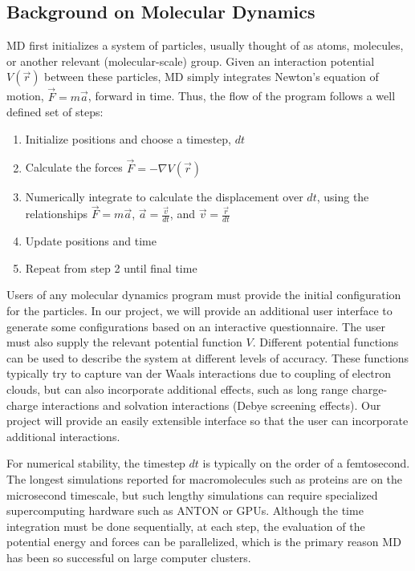 \documentclass[10pt]{article}
\begin{document}
\subsection{Background on Molecular Dynamics}
MD first initializes a system of particles, usually thought of as atoms, molecules, or another relevant (molecular-scale) group.  Given an interaction potential $V (\overrightarrow{r})$ between these particles, MD simply integrates Newton's equation of motion, $\overrightarrow{F}=m\overrightarrow{a}$, forward in time.  Thus, the flow of the program follows a well defined set of steps:
\begin{enumerate}
    \item Initialize positions and choose a timestep, $dt$
    \item Calculate the forces $\overrightarrow{F} =  -\nabla V (\overrightarrow{r}) $
    \item Numerically integrate to calculate the displacement over $dt$, using the relationships $\overrightarrow{F}=m\overrightarrow{a}$, $\overrightarrow{a} = \frac{\overrightarrow{v}}{dt}$, and $\overrightarrow{v} = \frac{\overrightarrow{r}}{dt}$
    \item Update positions and time
    \item Repeat from step 2 until final time
\end{enumerate}

Users of any molecular dynamics program must provide the initial configuration for the particles.  In our project, we will provide an additional user interface to generate some configurations based on an interactive questionnaire. The user must also supply the relevant potential function $V$. Different potential functions can be used to describe the system at different levels of accuracy. These functions typically try to capture van der Waals interactions due to coupling of electron clouds, but can also incorporate additional effects, such as long range charge-charge interactions and solvation interactions (Debye screening effects). Our project will provide an easily extensible interface so that the user can incorporate additional interactions.

For numerical stability, the timestep $dt$ is typically on the order of a femtosecond. The longest simulations reported for macromolecules such as proteins are on the microsecond timescale, but such lengthy simulations can require specialized supercomputing hardware such as ANTON or GPUs. Although the time integration must be done sequentially, at each step, the evaluation of the potential energy and forces can be parallelized, which is the primary reason MD has been so successful on large computer clusters.
\end{document}
